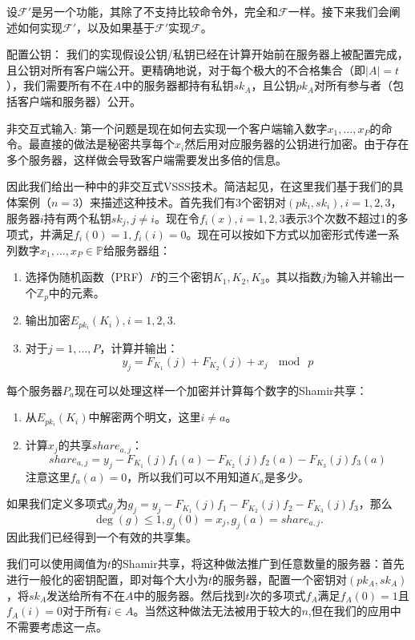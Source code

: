 设$\mathcal{F}'$是另一个功能，其除了不支持比较命令外，完全和$\mathcal{F}$一样。接下来我们会阐述如何实现$\mathcal{F}'$，以及如果基于$\mathcal{F}'$实现$\mathcal{F}$。

{\heiti 配置公钥：} 我们的实现假设公钥/私钥已经在计算开始前在服务器上被配置完成，且公钥对所有客户端公开。更精确地说，对于每个极大的不合格集合（即$|A|=t$），我们需要所有不在$A$中的服务器都持有私钥$sk_A$，且公钥$pk_A$对所有参与者（包括客户端和服务器）公开。

{\heiti 非交互式输入:} 第一个问题是现在如何去实现一个客户端输入数字$x_1,\dots,x_P$的命令。最直接的做法是秘密共享每个$x_i$然后用对应服务器的公钥进行加密。由于存在多个服务器，这样做会导致客户端需要发出多倍的信息。

因此我们给出一种中的非交互式VSSS技术。简洁起见，在这里我们基于我们的具体案例（$n=3$）来描述这种技术。首先我们有3个密钥对$(pk_i,sk_i),i=1,2,3$，服务器$i$持有两个私钥$sk_j,j\neq i$。现在令$f_i(x),i=1,2,3$表示3个次数不超过1的多项式，并满足$f_i(0)=1,f_i(i)=0$。现在可以按如下方式以加密形式传递一系列数字$x_1,\dots,x_P\in\mathbb{P}$给服务器组：
\begin{enumerate}
	\item 选择伪随机函数（PRF）$F$的三个密钥$K_1,K_2,K_3$。其以指数$j$为输入并输出一个$\mathbb{Z}_p$中的元素。
	\item 输出加密$E_{pk_i}(K_i),i=1,2,3$.
	\item 对于$j=1,\dots,P$，计算并输出：
		$$y_j=F_{K_1}(j)+F_{K_2}(j)+x_j\ \mod\ p$$
\end{enumerate}
每个服务器$P_a$现在可以处理这样一个加密并计算每个数字的Shamir共享：
\begin{enumerate}
	\item 从$E_{pk_i}(K_i)$中解密两个明文，这里$i\neq a$。
	\item 计算$x_j$的共享$share_{a,j}$：
	$$share_{a,j}=y_j-F_{K_1}(j)f_1(a)-F_{K_2}(j)f_2(a)-F_{K_3}(j)f_3(a)$$
	注意这里$f_a(a)=0$，所以我们可以不用知道$K_a$是多少。
\end{enumerate}

如果我们定义多项式$g_j$为$g_j=y_j-F_{K_1}(j)f_1-F_{K_2}(j)f_2-F_{K_3}(j)f_3$，那么
$$\deg(g)\leq 1,g_j(0)=x_j,g_j(a)=share_{a,j}.$$
因此我们已经得到一个有效的共享集。

我们可以使用阈值为$t$的Shamir共享，将这种做法推广到任意数量的服务器：首先进行一般化的密钥配置，即对每个大小为$t$的服务器，配置一个密钥对$(pk_A,sk_A)$，将$sk_A$发送给所有不在$A$中的服务器。然后找到$t$次的多项式$f_A$满足$f_A(0)=1$且$f_A(i)=0$对于所有$i\in A$。当然这种做法无法被用于较大的$n$,但在我们的应用中不需要考虑这一点。

